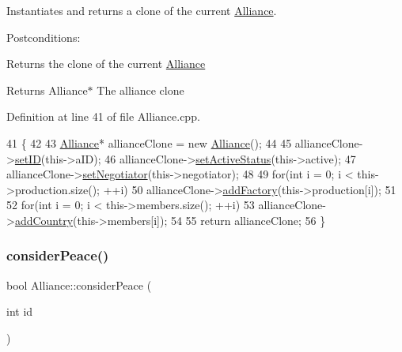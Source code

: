 Instantiates and returns a clone of the current \hyperlink{classAlliance}{Alliance}. 

Postconditions\+:
\begin{DoxyItemize}
\item Returns the clone of the current \hyperlink{classAlliance}{Alliance}
\end{DoxyItemize}

\begin{DoxyReturn}{Returns}
Alliance$\ast$ The alliance clone 
\end{DoxyReturn}


Definition at line 41 of file Alliance.\+cpp.


\begin{DoxyCode}
41                           \{
42     
43     \hyperlink{classAlliance}{Alliance}* allianceClone = \textcolor{keyword}{new} \hyperlink{classAlliance_a262a2819e969b465eb9548e419bad521}{Alliance}();
44 
45     allianceClone->\hyperlink{classAlliance_ace044c4ae0ede7f19990279f163b6f37}{setID}(this->aID);
46     allianceClone->\hyperlink{classAlliance_a21492fd899af1441c9d8ddf11a558e7d}{setActiveStatus}(this->active);
47     allianceClone->\hyperlink{classAlliance_a80f9a001ba5bad946690111b775c2349}{setNegotiator}(this->negotiator);
48 
49     \textcolor{keywordflow}{for}(\textcolor{keywordtype}{int} i = 0; i < this->production.size(); ++i)
50         allianceClone->\hyperlink{classAlliance_ab1ba99d78866c13e17031afa3bdd727e}{addFactory}(this->production[i]);
51 
52     \textcolor{keywordflow}{for}(\textcolor{keywordtype}{int} i = 0; i < this->members.size(); ++i)
53         allianceClone->\hyperlink{classAlliance_a7e5d92ca269e0d21b80978b0f72a2230}{addCountry}(this->members[i]);
54 
55     \textcolor{keywordflow}{return} allianceClone;
56 \}
\end{DoxyCode}
\mbox{\label{classAlliance_acd8720fdba717c3e551a88ff6a1010b5}} 
\subsubsection{\texorpdfstring{consider\+Peace()}{considerPeace()}}
{\footnotesize\ttfamily bool Alliance\+::consider\+Peace (\begin{DoxyParamCaption}\item[{int}]{id }\end{DoxyParamCaption})}



